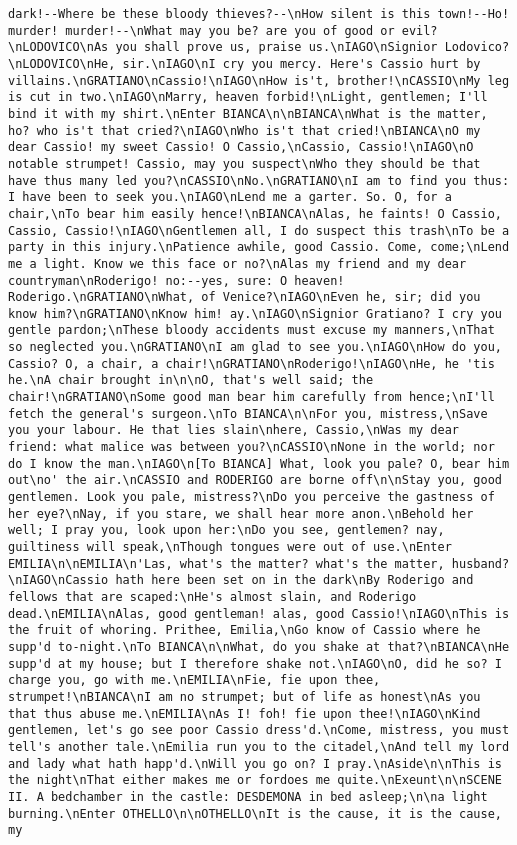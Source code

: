 \begin{verbatim}
dark!--Where be these bloody thieves?--\nHow silent is this town!--Ho! murder! murder!--\nWhat may you be? are you of good or evil?\nLODOVICO\nAs you shall prove us, praise us.\nIAGO\nSignior Lodovico?\nLODOVICO\nHe, sir.\nIAGO\nI cry you mercy. Here's Cassio hurt by villains.\nGRATIANO\nCassio!\nIAGO\nHow is't, brother!\nCASSIO\nMy leg is cut in two.\nIAGO\nMarry, heaven forbid!\nLight, gentlemen; I'll bind it with my shirt.\nEnter BIANCA\n\nBIANCA\nWhat is the matter, ho? who is't that cried?\nIAGO\nWho is't that cried!\nBIANCA\nO my dear Cassio! my sweet Cassio! O Cassio,\nCassio, Cassio!\nIAGO\nO notable strumpet! Cassio, may you suspect\nWho they should be that have thus many led you?\nCASSIO\nNo.\nGRATIANO\nI am to find you thus: I have been to seek you.\nIAGO\nLend me a garter. So. O, for a chair,\nTo bear him easily hence!\nBIANCA\nAlas, he faints! O Cassio, Cassio, Cassio!\nIAGO\nGentlemen all, I do suspect this trash\nTo be a party in this injury.\nPatience awhile, good Cassio. Come, come;\nLend me a light. Know we this face or no?\nAlas my friend and my dear countryman\nRoderigo! no:--yes, sure: O heaven! Roderigo.\nGRATIANO\nWhat, of Venice?\nIAGO\nEven he, sir; did you know him?\nGRATIANO\nKnow him! ay.\nIAGO\nSignior Gratiano? I cry you gentle pardon;\nThese bloody accidents must excuse my manners,\nThat so neglected you.\nGRATIANO\nI am glad to see you.\nIAGO\nHow do you, Cassio? O, a chair, a chair!\nGRATIANO\nRoderigo!\nIAGO\nHe, he 'tis he.\nA chair brought in\n\nO, that's well said; the chair!\nGRATIANO\nSome good man bear him carefully from hence;\nI'll fetch the general's surgeon.\nTo BIANCA\n\nFor you, mistress,\nSave you your labour. He that lies slain\nhere, Cassio,\nWas my dear friend: what malice was between you?\nCASSIO\nNone in the world; nor do I know the man.\nIAGO\n[To BIANCA] What, look you pale? O, bear him out\no' the air.\nCASSIO and RODERIGO are borne off\n\nStay you, good gentlemen. Look you pale, mistress?\nDo you perceive the gastness of her eye?\nNay, if you stare, we shall hear more anon.\nBehold her well; I pray you, look upon her:\nDo you see, gentlemen? nay, guiltiness will speak,\nThough tongues were out of use.\nEnter EMILIA\n\nEMILIA\n'Las, what's the matter? what's the matter, husband?\nIAGO\nCassio hath here been set on in the dark\nBy Roderigo and fellows that are scaped:\nHe's almost slain, and Roderigo dead.\nEMILIA\nAlas, good gentleman! alas, good Cassio!\nIAGO\nThis is the fruit of whoring. Prithee, Emilia,\nGo know of Cassio where he supp'd to-night.\nTo BIANCA\n\nWhat, do you shake at that?\nBIANCA\nHe supp'd at my house; but I therefore shake not.\nIAGO\nO, did he so? I charge you, go with me.\nEMILIA\nFie, fie upon thee, strumpet!\nBIANCA\nI am no strumpet; but of life as honest\nAs you that thus abuse me.\nEMILIA\nAs I! foh! fie upon thee!\nIAGO\nKind gentlemen, let's go see poor Cassio dress'd.\nCome, mistress, you must tell's another tale.\nEmilia run you to the citadel,\nAnd tell my lord and lady what hath happ'd.\nWill you go on? I pray.\nAside\n\nThis is the night\nThat either makes me or fordoes me quite.\nExeunt\n\nSCENE II. A bedchamber in the castle: DESDEMONA in bed asleep;\n\na light burning.\nEnter OTHELLO\n\nOTHELLO\nIt is the cause, it is the cause, my 
\end{verbatim}
